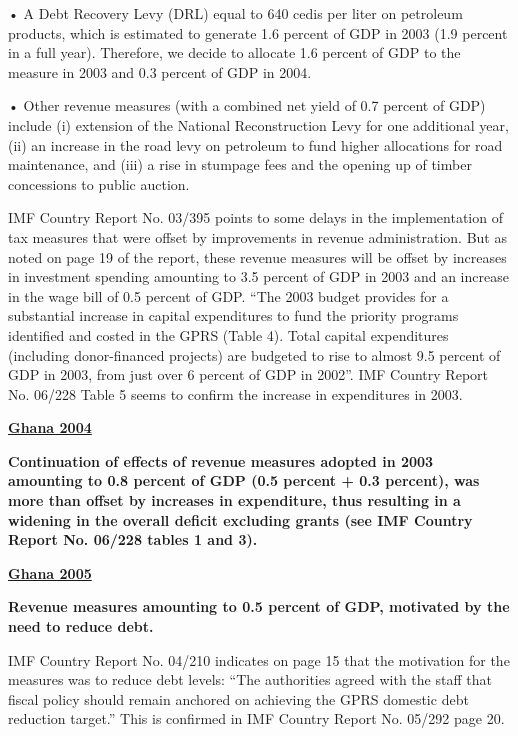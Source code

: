 •	A Debt Recovery Levy (DRL) equal to 640 cedis per liter on petroleum products, which is estimated to generate 1.6 percent of GDP in 2003 (1.9 percent in a full year). Therefore, we decide to allocate 1.6  percent of GDP to the measure in 2003 and 0.3 percent of GDP in 2004.

•	Other revenue measures (with a combined net yield of 0.7 percent of GDP) include (i) extension of the National Reconstruction Levy for one additional year, (ii) an increase in the road levy on petroleum to fund higher allocations for road maintenance, and (iii) a rise in stumpage fees and the opening up of timber concessions to public auction.

IMF Country Report No. 03/395 points to some delays in the implementation of tax measures that were offset by improvements in revenue administration. But as noted on page 19 of the report, these revenue measures will be offset by increases in investment spending amounting to 3.5 percent of GDP in 2003 and an increase in the wage bill of 0.5 percent of GDP. “The 2003 budget provides for a substantial increase in capital expenditures to fund the priority programs identified and costed in the GPRS (Table 4). Total capital expenditures (including donor-financed projects) are budgeted to rise to almost 9.5 percent of GDP in 2003, from just over 6 percent of GDP in 2002”. IMF Country Report No. 06/228 Table 5 seems to confirm the increase in expenditures in 2003.

\textbf{\underline{Ghana 2004}}

\textbf{Continuation of effects of revenue measures adopted in 2003 amounting to 0.8 percent of GDP (0.5 percent + 0.3 percent), was more than offset by increases in expenditure, thus resulting in a widening in the overall deficit excluding grants (see IMF Country Report No. 06/228 tables 1 and 3).}

\textbf{\underline{Ghana 2005}}

\textbf{Revenue measures amounting to 0.5 percent of GDP, motivated by the need to reduce debt.} 

IMF Country Report No. 04/210 indicates on page 15 that the motivation for the measures was to reduce debt levels: “The authorities agreed with the staff that fiscal policy should remain anchored on achieving the GPRS domestic debt reduction target.” This is confirmed in IMF Country Report No. 05/292 page 20.

